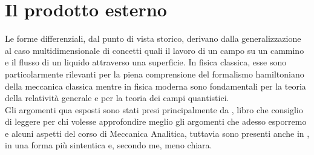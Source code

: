 \chapter{Il prodotto esterno}
\pagestyle{plain}
\thispagestyle{empty}
\pagestyle{fancy}
Le forme differenziali, dal punto di vista storico, derivano dalla generalizzazione al caso multidimensionale di concetti
quali il lavoro di un campo su un cammino e il flusso di un liquido attraverso una superficie. In fisica classica, esse sono particolarmente
rilevanti per la piena comprensione del formalismo hamiltoniano della meccanica classica mentre in fisica moderna sono fondamentali per la
teoria della relatività generale e per la teoria dei campi quantistici. \\
Gli argomenti qua esposti sono stati presi principalmente da \cite{arnold}, libro che consiglio di leggere per chi volesse approfondire meglio gli argomenti che adesso esporremo e alcuni aspetti del corso di Meccanica Analitica, tuttavia sono presenti anche in \cite{rudin}, in una forma più sintentica e, secondo me, meno chiara.

